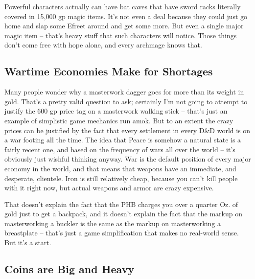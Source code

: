 Powerful characters actually can have bat caves that have sword racks literally covered in 15,000 gp magic items. It's not even a deal because they could just go home and slap some Efreet around and get some more. But even a single major magic item -- that's heavy stuff that such characters will notice. Those things don't come free with hope alone, and every archmage knows that.

\subsection{Wartime Economies Make for Shortages}

Many people wonder why a masterwork dagger goes for more than its weight in gold. That's a pretty valid question to ask; certainly I'm not going to attempt to justify the 600 gp price tag on a masterwork walking stick -- that's just an example of simplistic game mechanics run amok. But to an extent the crazy prices can be justified by the fact that every settlement in every D\&D world is on a war footing all the time. The idea that Peace is somehow a natural state is a fairly recent one, and based on the frequency of wars all over the world -- it's obviously just wishful thinking anyway. War is the default position of every major economy in the world, and that means that weapons have an immediate, and desperate, clientele. Iron is still relatively cheap, because you can't kill people with it right now, but actual weapons and armor are crazy expensive.

That doesn't explain the fact that the PHB charges you over a quarter Oz. of gold just to get a backpack, and it doesn't explain the fact that the markup on masterworking a buckler is the same as the markup on masterworking a breastplate -- that's just a game simplification that makes no real-world sense. But it's a start.

\subsection{Coins are Big and Heavy}
\vspace*{-8pt}


